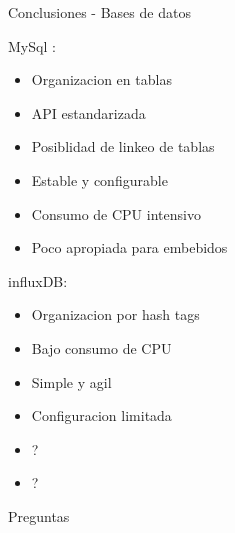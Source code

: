 \documentclass[aspectratio= 43]{beamer}
\begin{document}
\begin{frame}{Conclusiones - Bases de datos}
      \begin{multicols}{2}
			MySql :
			\begin{itemize}
            \item Organizacion en tablas
            \item API estandarizada
            \item Posiblidad de linkeo de tablas
            \item Estable y configurable
            \item Consumo de CPU intensivo
            \item Poco apropiada para embebidos
			\end{itemize}

			\columnbreak

			influxDB:
			\begin{itemize}
            \item Organizacion por hash tags
            \item Bajo consumo de CPU
            \item Simple y agil
            \item Configuracion limitada
            \item ?
            \item ?
			\end{itemize}
      \end{multicols} 
  \end{frame}


  \begin{frame}{Preguntas}
  \end{frame}
\end{document}
